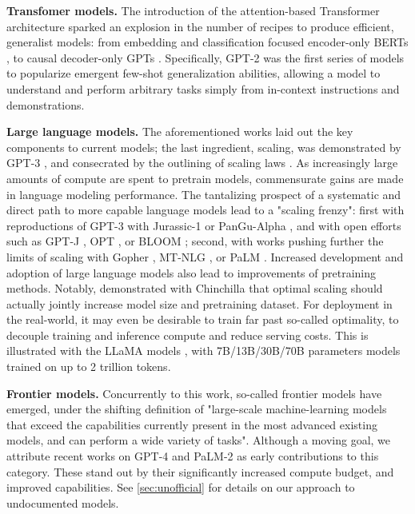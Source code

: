 \documentclass{article}
\begin{document}
\textbf{Transfomer models.} The introduction of the attention-based Transformer architecture \citet{vaswani2017attention} sparked an explosion in the number of recipes to produce efficient, generalist models: from embedding and classification focused encoder-only BERTs \citep{kenton2019bert}, to causal decoder-only GPTs \citep{radford2018gpt}. Specifically, GPT-2 \citep{radford2019language} was the first series of models to popularize emergent few-shot generalization abilities, allowing a model to understand and perform arbitrary tasks simply from in-context instructions and demonstrations. 

\textbf{Large language models.} The aforementioned works laid out the key components to current models; the last ingredient, scaling, was demonstrated by GPT-3 \citep{brown2020gpt3}, and consecrated by the outlining of scaling laws 
\citep{kaplan2020scaling}. As increasingly large amounts of compute are spent to pretrain models, commensurate gains are made in language modeling performance. The tantalizing prospect of a systematic and direct path to more capable language models lead to a "scaling frenzy": first with reproductions of GPT-3 with Jurassic-1 \citep{J1WhitePaper} or PanGu-Alpha \citep{zeng2021pangu}, and with open efforts such as GPT-J \citep{gpt-j}, OPT \citep{zhang2022opt}, or BLOOM \citep{bloom}; second, with works pushing further the limits of scaling with Gopher \citep{gopher}, MT-NLG \citep{smith2022using}, or PaLM \citep{palm}. Increased development and adoption of large language models also lead to improvements of pretraining methods. Notably, \citet{hoffmann2022training} demonstrated with Chinchilla that optimal scaling should actually jointly increase model size and pretraining dataset. For deployment in the real-world, it may even be desirable to train far past so-called optimality, to decouple training and inference compute and reduce serving costs. This is illustrated with the LLaMA models \citep{llama, llama2}, with 7B/13B/30B/70B parameters models trained on up to 2 trillion tokens.

\textbf{Frontier models.} Concurrently to this work, so-called frontier models have emerged, under the shifting definition of "large-scale machine-learning models that exceed the capabilities currently present in the most advanced existing models, and can perform a wide variety of tasks". Although a moving goal, we attribute recent works on GPT-4 \citep{gpt-4} and PaLM-2 \citep{palm-2} as early contributions to this category. These stand out by their significantly increased compute budget, and improved capabilities. See \cref{sec:unofficial} for details on our approach to undocumented models.
\end{document}
